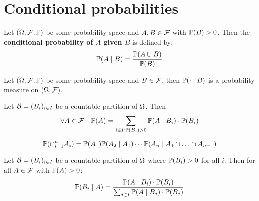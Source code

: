 \section{Conditional probabilities}

\begin{definition*}
  Let \((\O, \F, \P)\) be some probability space and \(A, B \in \F\) with \(\P(B) > 0\). Then the \textbf{conditional probability of \(A\) given \(B\)} is defined by:
  \[\P(A \mid B) = \frac{\P(A \cup B)}{\P(B)}\]
\end{definition*}

\begin{proposition}
  Let \((\O, \F, \P)\) be some probability space and \(B \in \F\). then \(\P(\cdot \mid B)\) is a probability measure on \((\O, \F)\).
\end{proposition}

\begin{theorem*}
  Let \(\B = (B_i)_{i \in I}\) be a countable partition of \(\O\). Then
  \vspace{-10pt}
  \[\forall A \in \F \quad \P(A) = \sum_{i \in I: \P(B_i) > 0} \P(A \mid B_i) \cdot \P(B_i)\]
\end{theorem*}

\begin{theorem*}
  \vspace{-12pt}
 \[ \P(\cap_{i=1}^n A_i) = \P(A_1) \P(A_2 \mid A_1) \cdots \P(A_n \mid A_1 \cap \ldots \cap A_{n-1})\]
\end{theorem*}

\begin{theorem*}
  Let \(\B = (B_i)_{i \in I}\) be a countable partition of \(\O\) where \(\P(B_i) > 0\) for all \(i\). Then for all \(A \in \F\) with \(\P(A) > 0\):
  \[\P(B_i \mid A) = \frac{\P(A \mid B_i) \cdot \P(B_i)}{\sum_{j \in I} \P(A \mid B_j) \cdot \P(B_j)}\]
\end{theorem*}

